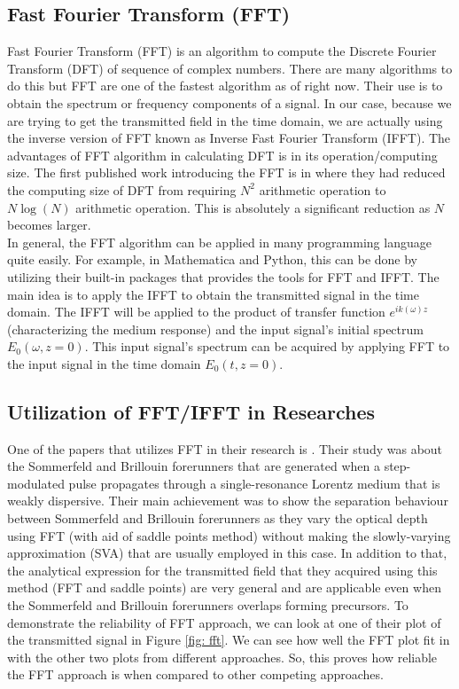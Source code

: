 \subsection{Fast Fourier Transform (FFT)}
Fast Fourier Transform (FFT) is an algorithm to compute the Discrete Fourier Transform (DFT) of sequence of complex numbers. There are many algorithms to do this but FFT are one of the fastest algorithm as of right now. Their use is to obtain the spectrum or frequency components of a signal. In our case, because we are trying to get the transmitted field in the time domain, we are actually using the inverse version of FFT known as Inverse Fast Fourier Transform (IFFT). The advantages of FFT algorithm in calculating DFT is in its operation/computing size. The first published work introducing the FFT is in \cite{Cooley1965} where they had reduced the computing size of DFT from requiring $N^2$ arithmetic operation to $N \log(N)$ arithmetic operation. This is absolutely a significant reduction as $N$ becomes larger.\\

In general, the FFT algorithm can be applied in many programming language quite easily. For example, in Mathematica and Python, this can be done by utilizing their built-in packages that provides the tools for FFT and IFFT. The main idea is to apply the IFFT to obtain the transmitted signal in the time domain. The IFFT will be applied to the product of transfer function $e^{i k(\omega)z}$ (characterizing the medium response) and the input signal's initial spectrum $E_{0}(\omega, z = 0)$. This input signal's spectrum can be acquired by applying FFT to the input signal in the time domain $E_{0}(t, z = 0)$.

\subsection{Utilization of FFT/IFFT in Researches}
One of the papers that utilizes FFT in their research is \cite{Macke2013}. Their study was about the Sommerfeld and Brillouin forerunners that are generated when a step-modulated pulse propagates through a single-resonance Lorentz medium that is weakly dispersive. Their main achievement was to show the separation behaviour between Sommerfeld and Brillouin forerunners as they vary the optical depth using FFT (with aid of saddle points method) without making the slowly-varying approximation (SVA) that are usually employed in this case. In addition to that, the analytical expression for the transmitted field that they acquired using this method (FFT and saddle points) are very general and are applicable even when the Sommerfeld and Brillouin forerunners overlaps forming precursors. To demonstrate the reliability of FFT approach, we can look at one of their plot of the transmitted signal in Figure \ref{fig: fft}. We can see how well the FFT plot fit in with the other two plots from different approaches. So, this proves how reliable the FFT approach is when compared to other competing approaches.\\

